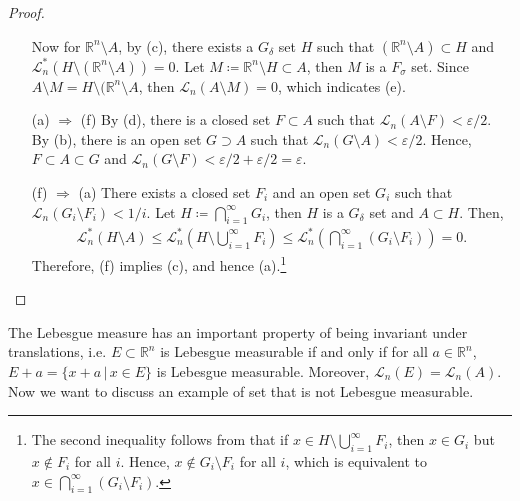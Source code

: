 \documentclass[11pt]{book}
\theoremstyle{definition}
\numberwithin{equation}{chapter}
\def\L{{\mathcal L}}
\begin{document}
\begin{proof}
\begin{enumerate}
    Now for $\mathbb{R}^n \setminus A$, by (c), there exists a $G_\delta$ set $H$ such that $(\mathbb{R}^n \setminus A) \subset H$ and $\L_n^*(H \setminus (\mathbb{R}^n \setminus A)) = 0$. Let $M \coloneqq \mathbb{R}^n \setminus H \subset A$, then $M$ is a $F_\sigma$ set. Since $A \setminus M = H \setminus (\mathbb{R}^n \setminus A$, then $\L_n(A \setminus M) = 0$, which indicates (e).
    
    \item[(a)] $\Rightarrow$ (f) By (d), there is a closed set $F \subset A$ such that $\L_n(A \setminus F) < \varepsilon/2$. By (b), there is an open set $G \supset A$ such that  $\L_n(G \setminus A) < \varepsilon/2$. Hence, $F \subset A \subset G$ and $\L_n(G \setminus F) < \varepsilon/2 + \varepsilon/2 = \varepsilon$.
    
    \item[(f)] $\Rightarrow$ (a) There exists a closed set $F_i$ and an open set $G_i$ such that $\L_n(G_i\setminus F_i) < 1/i$. Let $H \coloneqq \bigcap^\infty_{i=1} G_i$, then $H$ is a $G_\delta$ set and $A \subset H$. Then,
    \begin{align*}
        \L_n^*(H \setminus A) \leq \L_n^*\left(H \setminus \bigcup^\infty_{i=1}F_i\right) \leq \L_n^*\left(\bigcap^\infty_{i=1}(G_i \setminus F_i)\right) = 0.
    \end{align*}
    Therefore, (f) implies (c), and hence (a).\footnote{The second inequality follows from that if $x \in H \setminus \bigcup^\infty_{i=1}F_i$, then $x \in G_i$ but $x \notin F_i$ for all $i$. Hence, $x \notin G_i \setminus F_i$ for all $i$, which is equivalent to $x \in \bigcap^\infty_{i=1} (G_i \setminus F_i)$.}
\end{enumerate}
\end{proof}

\medskip

The Lebesgue measure has an important property of being invariant under translations, i.e. $E \subset \mathbb{R}^n$ is Lebesgue measurable if and only if for all $a \in \mathbb{R}^n$, $E+a = \{x+a\,|\, x \in E\}$ is Lebesgue measurable. Moreover, $\L_n(E) = \L_n(A)$. Now we want to discuss an example of set that is not Lebesgue measurable.

\medskip
\end{document}
